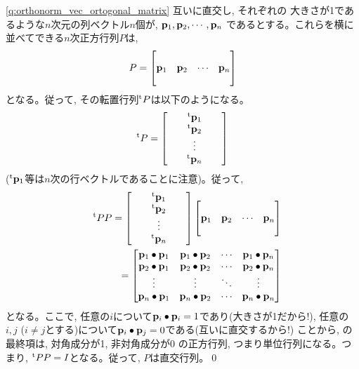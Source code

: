 %
\ref{q:orthonorm_vec_ortogonal_matrix} 互いに直交し, それぞれの
大きさが1であるような$n$次元の列ベクトル$n$個が, ${\bf p}_1, {\bf p}_2, \cdots, {\bf p}_n$
であるとする。これらを横に並べてできる$n$次正方行列$P$は, 
\begin{eqnarray}P=
\begin{bmatrix}
          &           &         &         \\
{\bf p}_1 & {\bf p}_2 & \cdots & {\bf p}_n\\
          &           &        &          \\
\end{bmatrix}
\end{eqnarray}
となる。従って, その転置行列$^{\text t}P$は以下のようになる。
\begin{eqnarray}^{\text t}P=
\begin{bmatrix}
 &  & ^{\text t}{\bf p}_1 &  & \\
 &  & ^{\text t}{\bf p}_2 &  & \\
 &  & \vdots &  & \\
 &  & ^{\text t}{\bf p}_n &  & \\
\end{bmatrix}
\end{eqnarray}
($^{\text t}{\bf p}_1$等は$n$次の行ベクトルであることに注意)。従って, 
\begin{eqnarray}
&&^{\text t}PP=
\begin{bmatrix}
 &  & ^{\text t}{\bf p}_1 &  & \\
 &  & ^{\text t}{\bf p}_2 &  & \\
 &  & \vdots &  & \\
 &  & ^{\text t}{\bf p}_n &  & \\
\end{bmatrix}
\begin{bmatrix}
          &           &         &         \\
{\bf p}_1 & {\bf p}_2 & \cdots & {\bf p}_n\\
          &           &        &          \\
\end{bmatrix}\nonumber\\
&&=\begin{bmatrix}
{\bf p}_1\bullet{\bf p}_1 & {\bf p}_1\bullet{\bf p}_2 & \cdots & {\bf p}_1\bullet{\bf p}_n\\
{\bf p}_2\bullet{\bf p}_1 & {\bf p}_2\bullet{\bf p}_2 & \cdots & {\bf p}_2\bullet{\bf p}_n\\
\vdots & \vdots & \ddots & \vdots\\
{\bf p}_n\bullet{\bf p}_1 & {\bf p}_n\bullet{\bf p}_2 & \cdots & {\bf p}_n\bullet{\bf p}_n\\
\end{bmatrix}\label{eq:orthonorm_vec_ortogonal_matrix_ans5}
\end{eqnarray}
となる。ここで, 任意の$i$について${\bf p}_i\bullet{\bf p}_i=1$であり(大きさが1だから!), 
任意の$i, j$ ($i\neq j$とする)について${\bf p}_i\bullet{\bf p}_j=0$である(互いに直交するから!)
ことから, の最終項は, 対角成分が1, 非対角成分が0
の正方行列, つまり単位行列になる。つまり, $^{\text t}PP=I$となる。従って, $P$は直交行列。\qed
\mv

